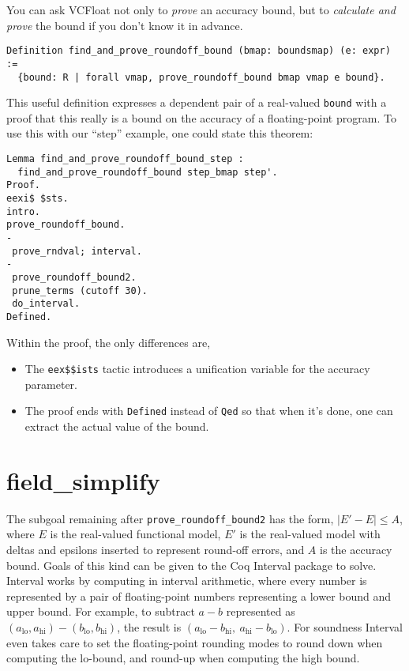 \documentclass[article]{memoir}
\begin{document}
You can ask VCFloat not only to \emph{prove} an accuracy bound,
but to \emph{calculate and prove} the bound if you don't know it
in advance.

\begin{lstlisting}
Definition find_and_prove_roundoff_bound (bmap: boundsmap) (e: expr) :=
  {bound: R | forall vmap, prove_roundoff_bound bmap vmap e bound}.
\end{lstlisting}

This useful definition expresses a dependent pair of a real-valued
\lstinline{bound} with a proof that this really is a bound
on the accuracy of a floating-point program.  To use this with
our ``step'' example, one could state this theorem:

\begin{lstlisting}
Lemma find_and_prove_roundoff_bound_step :
  find_and_prove_roundoff_bound step_bmap step'.
Proof.
eexi$ $sts.
intro.
prove_roundoff_bound.
-
 prove_rndval; interval.
-
 prove_roundoff_bound2.
 prune_terms (cutoff 30).
 do_interval.
Defined.
\end{lstlisting}

Within the proof, the only differences are,
\begin{itemize}
\item  The \lstinline{eex$$ists} tactic introduces a unification variable
  for the accuracy parameter.
\item The proof ends with \lstinline{Defined} instead of \lstinline{Qed}
  so that when it's done, one can extract the actual value of the bound.
\end{itemize}

\chapter{field\_simplify}

The subgoal remaining after \lstinline{prove_roundoff_bound2} has the
form, $|E'-E|\le A$, where $E$ is the real-valued functional model,
$E'$ is the real-valued model with deltas and epsilons inserted to
represent round-off errors, and $A$ is the accuracy bound.
Goals of this kind can be given to the Coq Interval package to solve.
Interval works by computing in interval arithmetic,
where every number is represented by a pair of floating-point numbers
representing a lower bound and upper bound.  For example, to subtract
$a-b$ represented as $(a_\mathrm{lo},a_\mathrm{hi})-(b_\mathrm{lo},b_\mathrm{hi})$,
the result is $(a_\mathrm{lo}-b_\mathrm{hi},~a_\mathrm{hi}-b_\mathrm{lo})$.
For soundness Interval even takes care to set the floating-point rounding modes
to round down when computing the lo-bound, and round-up when computing
the high bound.
\end{document}
